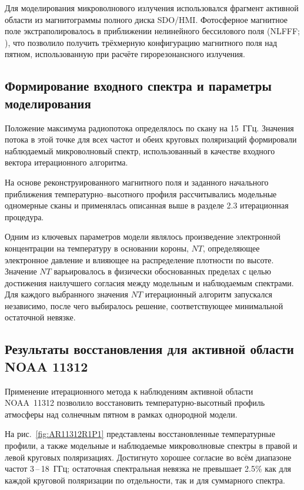 \documentclass[
 aps, pra,
 amsmath,amssymb,
 11pt,
 final,
tightenlines,
 twoside,
 twocolumn,
 nofloats,
nofootinbib,
 superscriptaddress,
showkeys,
showkeywords,
 ]
{revtex4-2}
\newcommand{\asrem}[1]{{#1}}
\begin{document}
Для моделирования микроволнового излучения использовался
фрагмент 
активной области из магнитограммы полного диска SDO/HMI.
Фотосферное магнитное поле экстраполировалось в приближении
нелинейного бессилового поля (NLFFF; \citealt{2023ApJS..267....6N}),
что позволило получить трёхмерную конфигурацию магнитного поля
над пятном, использованную при расчёте гирорезонансного излучения.

\subsection{  Формирование входного спектра и параметры моделирования}

 Положение максимума радиопотока определялось по скану на 15~ГГц. Значения потока в этой точке для всех частот и обеих круговых поляризаций формировали наблюдаемый микроволновый спектр, использованный в качестве входного вектора итерационного алгоритма.

На основе реконструированного магнитного поля и заданного начального приближения температурно--высотного профиля рассчитывались модельные одномерные сканы и применялась описанная выше в разделе %
2.3
итерационная процедура.

Одним из ключевых параметров модели являлось произведение электронной концентрации на температуру в основании короны, $NT$, определяющее электронное давление и влияющее на распределение плотности по высоте. Значение $NT$ варьировалось в физически обоснованных пределах с целью достижения наилучшего согласия между модельным и наблюдаемым спектрами. Для каждого выбранного значения $NT$ итерационный алгоритм запускался независимо, после чего выбиралось решение, соответствующее минимальной остаточной невязке. 

\subsection{Результаты восстановления для активной области NOAA 11312}

Применение итерационного метода к наблюдениям активной области
NOAA~11312 позволило восстановить температурно-высотный профиль
атмосферы над солнечным пятном в рамках однородной модели.

На рис.~\ref{fig:AR11312R1P1} представлены восстановленные
температурные профили, а также модельные и наблюдаемые
микроволновые спектры в правой и левой круговых поляризациях.
Достигнуто хорошее согласие во всём диапазоне частот
3\,--\,18~ГГц; остаточная спектральная невязка не превышает
\asrem{2.5\%} как для каждой круговой поляризации по отдельности, так и для суммарного спектра.
\end{document}
